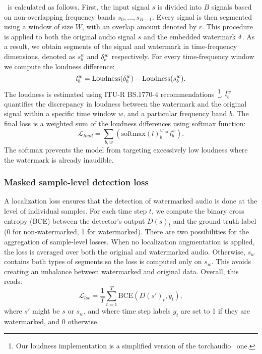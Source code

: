 \ploss\ is calculated as follows. 
First, the input signal $s$ is divided into $B$ signals based on non-overlapping frequency bands $s_0, \dots, s_{B-1}$. 
Every signal is then segmented using a window of size $W$, with an overlap amount denoted by $r$.
This procedure is applied to both the original audio signal \(s\) and the embedded watermark \(\delta\). 
As a result, we obtain segments of the signal and watermark in time-frequency dimensions, denoted as \(s_b^{w}\) and \(\delta_b^{w}\) respectively.
For every time-frequency window we compute the loudness difference:
\begin{equation}\label{chap4/eq:loudness_diff}
    l_b^w = \mathrm{Loudness}(\delta_b^w) - \mathrm{Loudness}(s_b^w).
\end{equation}
The loudness is estimated using ITU-R BS.1770-4 recommendations~\citep{loudness}\footnote{
    Our loudness implementation is a simplified version of the torchaudio~\citep{yang2021torchaudio} one.
}.
$l_b^w$ quantifies the discrepancy in loudness between the watermark and the original signal within a specific time window $w$, and a particular frequency band $b$.
The final loss is a weighted sum of the loudness differences using softmax function:
\begin{equation}\label{chap4/eq:perceptual_loss}
    \mathcal{L}_{loud} = \sum_{b, w} \left(\mathrm{softmax}(l)_b^w * l_b^w\right).
\end{equation}
The softmax prevents the model from targeting excessively low loudness where the watermark is already inaudible. 




\subsubsection*{Masked sample-level detection loss}

A localization loss ensures that the detection of watermarked audio is done at the level of individual samples. 
For each time step $t$, we compute the binary cross entropy (BCE) between the detector's output $D(s)_t$ and the ground truth label (0 for non-watermarked, 1 for watermarked).
There are two possibilities for the aggregation of sample-level losses.
When no localization augmentation is applied, the loss is averaged over both the original and watermarked audio.
Otherwise, $s_w$ contains both types of segments so the loss is computed only on $s_w$.
This avoids creating an imbalance between watermarked and original data. 
Overall, this reads:
\begin{equation}\label{chap4/eq:loc_loss}
    \mathcal{L}_{loc}
    = \frac{1}{T} \sum_{t=1}^{T} \mathrm{BCE}(D(s')_t, y_t),
\end{equation}
where $s'$ might be $s$ or $s_w$, and where time step labels $y_t$ are set to 1 if they are watermarked, and 0 otherwise. 









